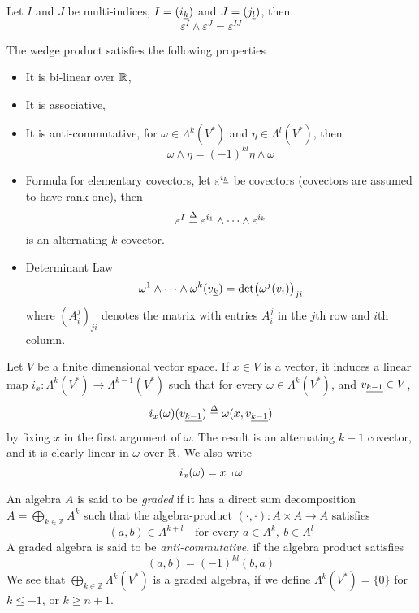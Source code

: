 \documentclass[../main-manifolds.tex]{subfiles}
\begin{document}
\begin{wts}[Lemma 14.10]
    Let $I$ and $J$ be multi-indices, $I = (\Ul{i}[k])$ and $J = (\Ul{j}[l])$, then
    \begin{equation}
        \varepsilon^I\wedge\varepsilon^J = \varepsilon^{IJ}
    \end{equation}
\end{wts}

\begin{wts}\label{lee-chp14:lemma14.11}
    The wedge product satisfies the following properties
    \begin{itemize}
        \item It is bi-linear over $\mathbb{R}$,
        \item It is associative,
        \item It is anti-commutative, for $\omega\in\Lambda^k(V^*)$ and $\eta\in\Lambda^l(V^*)$, then
        \[
            \omega\wedge\eta = (-1)^{kl}\eta\wedge\omega
        \]
        \item Formula for elementary covectors, let $\varepsilon^{\Ul{i}[k]}$ be covectors (covectors are assumed to have rank one), then
        \[
        \varepsilon^I\overset{\Delta}{=} \varepsilon^{i_1}\wedge\cdots\wedge \varepsilon^{i_k}
        \]
        is an alternating $k$-covector.
        \item Determinant Law
        \[
            \omega^1\wedge\cdots\wedge \omega^k(\Ul{v}[k]) = \det(\omega^j(v_i))_{ji}
        \]
        where $(A^j_i)_{ji}$ denotes the matrix with entries $A^j_i$ in the $j$th row and $i$th column.
    \end{itemize}
\end{wts}

\begin{definition}
    Let $V$ be a finite dimensional vector space.  If $x\in V$ is a vector, it induces a linear map $i_x: \Lambda^k(V^*)\to \Lambda^{k-1}(V^*)$ such that for every $\omega\in \Lambda^k(V^*)$, and $\Ul{v}[k-1]\in V$, 
    \[
        i_x(\omega)(\Ul{v}[k-1]) \defined \omega(x,\Ul{v}[k-1])
    \]
    by fixing $x$ in the first argument of $\omega$. The result is an alternating $k-1$ covector, and it is clearly linear in $\omega$ over $\mathbb{R}$. We also write
    \[
        i_x(\omega) = x\mathop{\lrcorner} \omega
    \]
\end{definition}


\begin{definition}
    An algebra $A$ is said to be \emph{graded} if it has a direct sum decomposition $A = \bigoplus_{k\in \mathbb{Z}}A^k$ such that the algebra-product $(\cdot,\cdot): A\times A\to A$ satisfies 
    \[
        (a,b)\in A^{k+l}\quad\text{for every }a\in A^k,\: b\in A^l
    \]
    A graded algebra is said to be \emph{anti-commutative}, if the algebra product satisfies
    \[
        (a,b) = (-1)^{kl}(b,a)
    \]
    We see that $\bigoplus_{k\in \mathbb{Z}}\Lambda^k(V^*)$ is a graded algebra, if we define $\Lambda^k(V^*)=\{0\}$ for $k\leq -1$, or $k\geq n+1$. 

\end{definition}
\end{document}
